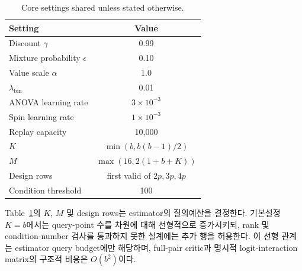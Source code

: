 \documentclass[10pt,journal]{IEEEtran}
\begin{document}
\begin{table}[!t]
\centering
\caption{Core settings shared unless stated otherwise.}
\label{tab:supp-core-hyper}
\begin{tabular}{lc}
\toprule
Setting & Value \\
\midrule
Discount $\gamma$ & 0.99 \\
Mixture probability $\epsilon$ & 0.10 \\
Value scale $\alpha$ & 1.0 \\
$\lambda_{\mathrm{bin}}$ & 0.01 \\
ANOVA learning rate & $3\times10^{-3}$ \\
Spin learning rate & $1\times10^{-3}$ \\
Replay capacity & 10,000 \\
$K$ & $\min(b,b(b-1)/2)$ \\
$M$ & $\max(16,2(1+b+K))$ \\
Design rows & first valid of $2p,3p,4p$ \\
Condition threshold & 100 \\
\bottomrule
\end{tabular}
\end{table}

Table~\ref{tab:supp-core-hyper}의 $K$, $M$ 및 design rows는 estimator의 질의예산을 결정한다. 기본설정 $K=b$에서는 query-point 수를 차원에 대해 선형적으로 증가시키되, rank 및 condition-number 검사를 통과하지 못한 설계에는 추가 행을 허용한다. 이 선형 관계는 estimator query budget에만 해당하며, full-pair critic과 명시적 logit-interaction matrix의 구조적 비용은 $O(b^2)$이다.

\begin{table}[!t]
\centering
\caption{Environment-specific training settings.}
\label{tab:supp-env-hyper}
\end{table}
\end{document}
